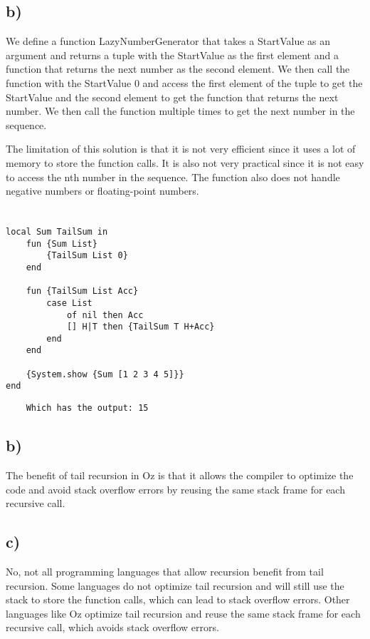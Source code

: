 \documentclass[11pt,a4paper]{report}
\begin{document}
\subsection{b)}
We define a function LazyNumberGenerator that takes a StartValue as an argument and returns a tuple with the StartValue as the first element and a function that returns the next number as the second element. 
We then call the function with the StartValue 0 and access the first element of the tuple to get the StartValue and the second element to get the function that returns the next number. 
We then call the function multiple times to get the next number in the sequence. 


The limitation of this solution is that it is not very efficient since it uses a lot of memory to store the function calls.
It is also not very practical since it is not easy to access the nth number in the sequence.
The function also does not handle negative numbers or floating-point numbers.

\section{}
\begin{lstlisting}[language=Oz]
local Sum TailSum in
    fun {Sum List}
        {TailSum List 0}
    end

    fun {TailSum List Acc}
        case List
            of nil then Acc
            [] H|T then {TailSum T H+Acc}
        end
    end

    {System.show {Sum [1 2 3 4 5]}}
end
\end{lstlisting}
\begin{verbatim}
    Which has the output: 15
\end{verbatim}

\subsection{b)}
The benefit of tail recursion in Oz is that it allows the compiler to optimize the code and avoid stack overflow errors by reusing the same stack frame for each recursive call.

\subsection{c)}
No, not all programming languages that allow recursion benefit from tail recursion.
Some languages do not optimize tail recursion and will still use the stack to store the function calls, which can lead to stack overflow errors.
Other languages like Oz optimize tail recursion and reuse the same stack frame for each recursive call, which avoids stack overflow errors.

   
\end{document}
